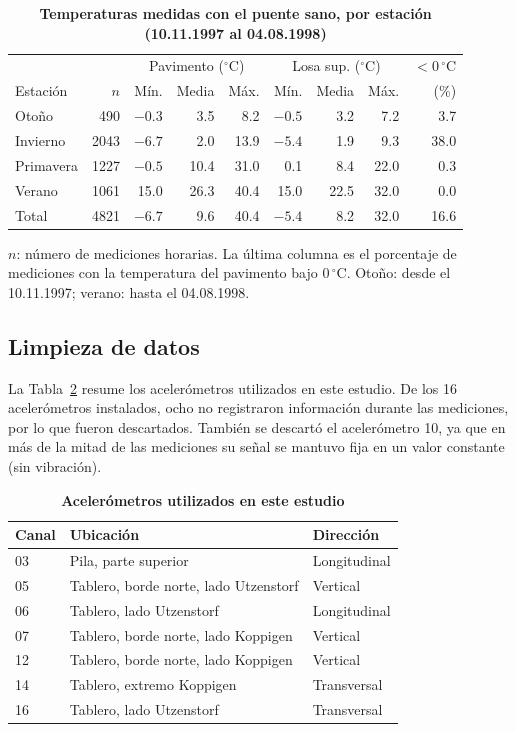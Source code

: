 \documentclass[9pt,twocolumn,twoside]{opticajnl}
\begin{document}
\begin{table}[H]
\centering
\caption{\bf Temperaturas medidas con el puente sano, por estación (10.11.1997 al 04.08.1998)}
\small
\setlength{\tabcolsep}{3pt}
\begin{tabular}{lrrrrrrrr}
\hline
 & & \multicolumn{3}{c}{Pavimento ($^\circ$C)} & \multicolumn{3}{c}{Losa sup. ($^\circ$C)} & $<0\,^\circ$C \\
Estación & $n$ & Mín. & Media & Máx. & Mín. & Media & Máx. & (\%) \\
\hline
Otoño & 490 & $-0.3$ & 3.5 & 8.2 & $-0.5$ & 3.2 & 7.2 & 3.7 \\
Invierno & 2043 & $-6.7$ & 2.0 & 13.9 & $-5.4$ & 1.9 & 9.3 & 38.0 \\
Primavera & 1227 & $-0.5$ & 10.4 & 31.0 & 0.1 & 8.4 & 22.0 & 0.3 \\
Verano & 1061 & 15.0 & 26.3 & 40.4 & 15.0 & 22.5 & 32.0 & 0.0 \\
\hline
Total & 4821 & $-6.7$ & 9.6 & 40.4 & $-5.4$ & 8.2 & 32.0 & 16.6 \\
\hline
\end{tabular}
  \label{tab:temperature-range}

\smallskip
\footnotesize
$n$: número de mediciones horarias. La última columna es el porcentaje de mediciones con la temperatura del pavimento bajo $0\,^\circ$C. Otoño: desde el 10.11.1997; verano: hasta el 04.08.1998.
\end{table}

\subsection{Limpieza de datos}

La Tabla~\ref{tab:accelerometers} resume los acelerómetros utilizados en este estudio. De los 16 acelerómetros instalados, ocho no registraron información durante las mediciones, por lo que fueron descartados. También se descartó el acelerómetro 10, ya que en más de la mitad de las mediciones su señal se mantuvo fija en un valor constante (sin vibración).

\begin{table}[H]
\centering
\caption{\bf Acelerómetros utilizados en este estudio}
\small
\begin{tabular}{lll}
\hline
Canal & Ubicación & Dirección \\
\hline
03 & Pila, parte superior & Longitudinal \\
05 & Tablero, borde norte, lado Utzenstorf & Vertical \\
06 & Tablero, lado Utzenstorf & Longitudinal \\
07 & Tablero, borde norte, lado Koppigen & Vertical \\
12 & Tablero, borde norte, lado Koppigen & Vertical \\
14 & Tablero, extremo Koppigen & Transversal \\
16 & Tablero, lado Utzenstorf & Transversal \\
\hline
\end{tabular}
  \label{tab:accelerometers}
\end{table}
\end{document}
